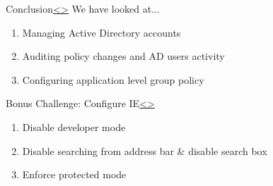 \documentclass[12pt]{extarticle}
\newenvironment{instructionblock}{\Large\bgroup}{\egroup}
\newcommand{\ben}{\begin{enumerate}}
\newcommand{\een}{\end{enumerate}}
\begin{document}

\pagebreak
\begin{slide}{Conclusion}{\hyperref[slide 12]{\textless}\hyperref[slide 14]{\textgreater}}
	\begin{instructionblock}
	We have looked at...
		\ben
			\item Managing Active Directory accounts
			\item Auditing policy changes and AD users activity
			\item Configuring application level group policy
		\een
	\end{instructionblock}
\end{slide}


\pagebreak
\begin{slide}{Bonus Challenge: Configure IE}{\hyperref[slide 13]{\textless}\hyperref[slide 15]{\textgreater}}
	\begin{instructionblock}
		\ben
			\item Disable developer mode
			\item Disable searching from address bar \& disable search box
			\item Enforce protected mode
		\een
	\end{instructionblock}
\end{slide}
\end{document}

